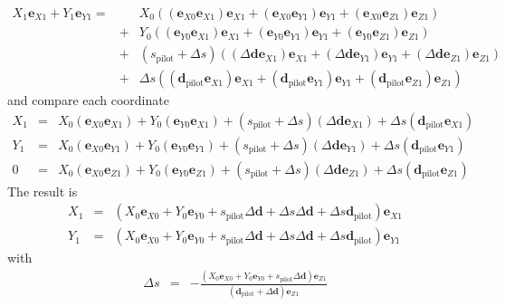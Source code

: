 \documentclass[12pt,a4paper,twoside,openright,BCOR10mm,headsepline,titlepage,abstracton,chapterprefix,final]{scrreprt}
\newcommand\Vector[1]{{\mathbf{#1}}}
\newcommand\pilot{\textrm{pilot}}
\begin{document}
\begin{eqnarray}
  X_1 \Vector{e}_{X1} + Y_1 \Vector{e}_{Y1} 
  =&& 
      X_0 ( (\Vector{e}_{X0} \Vector{e}_{X1}) \Vector{e}_{X1} + (\Vector{e}_{X0} \Vector{e}_{Y1}) \Vector{e}_{Y1} + (\Vector{e}_{X0} \Vector{e}_{Z1} ) \Vector{e}_{Z1}) \nonumber \\
  &+& Y_0 ( (\Vector{e}_{Y0} \Vector{e}_{X1}) \Vector{e}_{X1} + (\Vector{e}_{Y0} \Vector{e}_{Y1}) \Vector{e}_{Y1} + (\Vector{e}_{Y0} \Vector{e}_{Z1} ) \Vector{e}_{Z1}) \nonumber \\  
  &+& (s_{\pilot}+ \Delta s )( (\Delta \Vector{d} \Vector{e}_{X1}) \Vector{e}_{X1} + (\Delta \Vector{d} \Vector{e}_{Y1}) \Vector{e}_{Y1} + (\Delta \Vector{d} \Vector{e}_{Z1} ) \Vector{e}_{Z1}) \nonumber \\  
  &+& \Delta s ( (\Vector{d}_{\pilot} \Vector{e}_{X1}) \Vector{e}_{X1} + (\Vector{d}_{\pilot} \Vector{e}_{Y1}) \Vector{e}_{Y1} + (\Vector{d}_{\pilot} \Vector{e}_{Z1} ) \Vector{e}_{Z1})  
\end{eqnarray}
and compare each coordinate
\begin{eqnarray}
  X_1 &=& X_0 (\Vector{e}_{X0} \Vector{e}_{X1}) + Y_0 (\Vector{e}_{Y0} \Vector{e}_{X1}) + (s_{\pilot}+ \Delta s )(\Delta \Vector{d} \Vector{e}_{X1}) + \Delta s (\Vector{d}_{\pilot} \Vector{e}_{X1}) \\
  Y_1 &=& X_0 (\Vector{e}_{X0} \Vector{e}_{Y1}) + Y_0 (\Vector{e}_{Y0} \Vector{e}_{Y1}) + (s_{\pilot}+ \Delta s )(\Delta \Vector{d} \Vector{e}_{Y1}) + \Delta s (\Vector{d}_{\pilot} \Vector{e}_{Y1}) \\
  0   &=& X_0 (\Vector{e}_{X0} \Vector{e}_{Z1}) + Y_0 (\Vector{e}_{Y0} \Vector{e}_{Z1}) + (s_{\pilot}+ \Delta s )(\Delta \Vector{d} \Vector{e}_{Z1}) + \Delta s (\Vector{d}_{\pilot} \Vector{e}_{Z1} )
\end{eqnarray}
The result is
\begin{subequations}\label{eq:propagation_between_planes_exact_formula}
\begin{eqnarray}
  X_1      &=& \left( X_0 \Vector{e}_{X0} + Y_0 \Vector{e}_{Y0} + s_{\pilot}\Delta \Vector{d} + \Delta s \Delta \Vector{d} + \Delta s \Vector{d}_{\pilot} \right) \Vector{e}_{X1} 
  \\
  Y_1      &=& \left( X_0 \Vector{e}_{X0} + Y_0 \Vector{e}_{Y0} + s_{\pilot}\Delta \Vector{d} + \Delta s \Delta \Vector{d} + \Delta s \Vector{d}_{\pilot} \right) \Vector{e}_{Y1} 
\end{eqnarray}
\end{subequations}
with
\begin{eqnarray}
  \Delta s &=& -\frac{ \left( X_0 \Vector{e}_{X0} + Y_0 \Vector{e}_{Y0} + s_{\pilot} \Delta \Vector{d} \right) \Vector{e}_{Z1}}
                     { \left( \Vector{d}_{\pilot} + \Delta \Vector{d} \right)\Vector{e}_{Z1}  }
\end{eqnarray}
\end{document}
